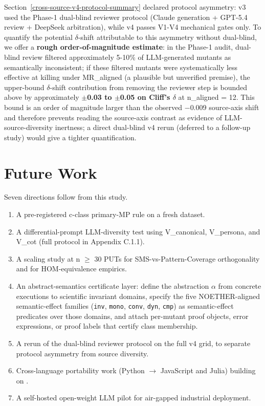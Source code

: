 \documentclass[manuscript,screen,review]{acmart}
\begin{document}
Section~\ref{cross-source-v4-protocol-summary} declared protocol asymmetry: v3 used the Phase-1 dual-blind
reviewer protocol (Claude generation + GPT-5.4 review + DeepSeek
arbitration), while v4 passes V1-V4 mechanical gates only. To quantify
the potential $\delta$-shift attributable to this asymmetry without dual-blind,
we offer a \textbf{rough order-of-magnitude estimate}: in the Phase-1
audit, dual-blind review filtered approximately 5-10\% of LLM-generated
mutants as semantically inconsistent; if these filtered mutants were
systematically less effective at killing under MR\_aligned (a plausible
but unverified premise), the upper-bound $\delta$-shift contribution from
removing the reviewer step is bounded above by approximately
\textbf{$\pm$0.03 to $\pm$0.05 on Cliff's $\delta$} at n\_aligned = 12. This bound is
an order of magnitude larger than the observed $-$0.009 source-axis shift
and therefore prevents reading the source-axis contrast as evidence of
LLM-source-diversity inertness; a direct dual-blind v4 rerun (deferred
to a follow-up study) would give a tighter quantification.


\section{Future Work}\label{future-work-and-p-series-roadmap}

Seven directions follow from this study.

\begin{enumerate}
\item
  A pre-registered c-class primary-MP rule on a fresh dataset.
\item
  A differential-prompt LLM-diversity test using V\_canonical,
  V\_persona, and V\_cot (full protocol in Appendix C.1.1).
\item
  A scaling study at n $\geq$ 30 PUTs for SMS-vs-Pattern-Coverage
  orthogonality and for HOM-equivalence empirics.
\item
  An abstract-semantics certificate layer: define the abstraction
  $\alpha$ from concrete executions to scientific invariant domains,
  specify the five NOETHER-aligned semantic-effect families
  (\texttt{inv}, \texttt{mono}, \texttt{conv}, \texttt{dyn},
  \texttt{cmp}) as semantic-effect predicates over those
  domains, and attach per-mutant proof objects, error expressions, or
  proof labels that certify class membership.
\item
  A rerun of the dual-blind reviewer protocol on the full v4 grid, to
  separate protocol asymmetry from source diversity.
\item
  Cross-language portability work (Python $\to$ JavaScript and Julia)
  building on \citet{tip2025llmorpheus}.
\item
  A self-hosted open-weight LLM pilot for air-gapped industrial
  deployment.
\end{enumerate}
\end{document}
